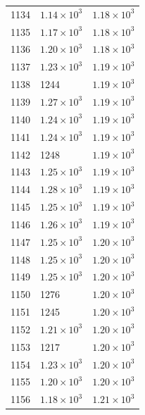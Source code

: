 \begin{table}[H]
\begin{tabular}{lll}
1134 & $\displaystyle 1.14 \times 10^{3}$ & $\displaystyle 1.18 \times 10^{3}$ \\
1135 & $\displaystyle 1.17 \times 10^{3}$ & $\displaystyle 1.18 \times 10^{3}$ \\
1136 & $\displaystyle 1.20 \times 10^{3}$ & $\displaystyle 1.18 \times 10^{3}$ \\
1137 & $\displaystyle 1.23 \times 10^{3}$ & $\displaystyle 1.19 \times 10^{3}$ \\
1138 & 1244 & $\displaystyle 1.19 \times 10^{3}$ \\
1139 & $\displaystyle 1.27 \times 10^{3}$ & $\displaystyle 1.19 \times 10^{3}$ \\
1140 & $\displaystyle 1.24 \times 10^{3}$ & $\displaystyle 1.19 \times 10^{3}$ \\
1141 & $\displaystyle 1.24 \times 10^{3}$ & $\displaystyle 1.19 \times 10^{3}$ \\
1142 & 1248 & $\displaystyle 1.19 \times 10^{3}$ \\
1143 & $\displaystyle 1.25 \times 10^{3}$ & $\displaystyle 1.19 \times 10^{3}$ \\
1144 & $\displaystyle 1.28 \times 10^{3}$ & $\displaystyle 1.19 \times 10^{3}$ \\
1145 & $\displaystyle 1.25 \times 10^{3}$ & $\displaystyle 1.19 \times 10^{3}$ \\
1146 & $\displaystyle 1.26 \times 10^{3}$ & $\displaystyle 1.19 \times 10^{3}$ \\
1147 & $\displaystyle 1.25 \times 10^{3}$ & $\displaystyle 1.20 \times 10^{3}$ \\
1148 & $\displaystyle 1.25 \times 10^{3}$ & $\displaystyle 1.20 \times 10^{3}$ \\
1149 & $\displaystyle 1.25 \times 10^{3}$ & $\displaystyle 1.20 \times 10^{3}$ \\
1150 & 1276 & $\displaystyle 1.20 \times 10^{3}$ \\
1151 & 1245 & $\displaystyle 1.20 \times 10^{3}$ \\
1152 & $\displaystyle 1.21 \times 10^{3}$ & $\displaystyle 1.20 \times 10^{3}$ \\
1153 & 1217 & $\displaystyle 1.20 \times 10^{3}$ \\
1154 & $\displaystyle 1.23 \times 10^{3}$ & $\displaystyle 1.20 \times 10^{3}$ \\
1155 & $\displaystyle 1.20 \times 10^{3}$ & $\displaystyle 1.20 \times 10^{3}$ \\
1156 & $\displaystyle 1.18 \times 10^{3}$ & $\displaystyle 1.21 \times 10^{3}$ \\

\end{tabular}
\end{table}
